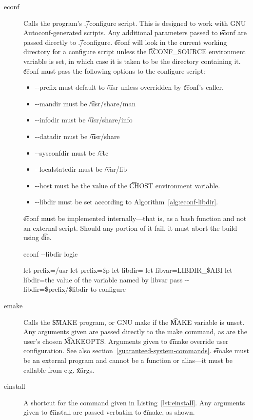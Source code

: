 \begin{description}
\item[econf] Calls the program's \t{./configure} script. This is designed to work with GNU
    Autoconf-generated scripts. Any additional parameters passed to \t{econf} are passed directly
    to \t{./configure}. \t{econf} will look in the current working directory for a configure script
    unless the \t{ECONF\_SOURCE} environment variable is set, in which case it is taken to be the
    directory containing it. \t{econf} must pass the following options to the configure script:
    \begin{itemize}
    \item -{}-prefix must default to \t{/usr} unless overridden by \t{econf}'s caller.
    \item -{}-mandir must be \t{/usr/share/man}
    \item -{}-infodir must be \t{/usr/share/info}
    \item -{}-datadir must be \t{/usr/share}
    \item -{}-sysconfdir must be \t{/etc}
    \item -{}-localstatedir must be \t{/var/lib}
    \item -{}-host must be the value of the \t{CHOST} environment variable.
    \item -{}-libdir must be set according to Algorithm~\ref{alg:econf-libdir}.
    \end{itemize}

    \t{econf} must be implemented internally---that is, as a bash function and not an external
    script. Should any portion of it fail, it must abort the build using \t{die}.

\begin{algorithm}
\caption{econf -{}-libdir logic} \label{alg:econf-libdir}
\begin{algorithmic}[1]
\STATE let prefix=/usr
    \STATE let prefix=\$p
\ENDIF
\STATE let libdir=
    \STATE let libvar=LIBDIR\_\$ABI
        \STATE let libdir=the value of the variable named by libvar
    \ENDIF
\ENDIF
{}
    \STATE pass -{}-libdir=\$prefix/\$libdir to configure
\ENDIF
\end{algorithmic}
\end{algorithm}

\item[emake] Calls the \t{\$MAKE} program, or GNU make if the \t{MAKE} variable is unset.  Any
    arguments given are passed directly to the make command, as are the user's chosen \t{MAKEOPTS}\@.
    Arguments given to \t{emake} override user configuration. See also
    section~\ref{guaranteed-system-commands}. \t{emake} must be an external program and cannot be a
    function or alias---it must be callable from e.g. \t{xargs}.
\item[einstall] A shortcut for the command given in Listing~\ref{lst:einstall}. Any arguments given
    to \t{einstall} are passed verbatim to \t{emake}, as shown.


\end{description}
